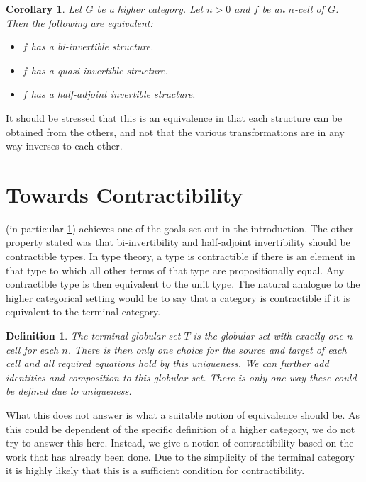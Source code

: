 \documentclass[draft]{article}
\newtheorem{cor}[theorem]{Corollary}
\newtheorem{definition}[theorem]{Definition} \theoremstyle{remark}
\begin{document}
\begin{cor}\label{cor:equiv}
  Let \(G\) be a higher category. Let \(n > 0\) and \(f\) be an
  \(n\)-cell of \(G\). Then the following are equivalent:
  \begin{itemize}
  \item \(f\) has a bi-invertible structure.
  \item \(f\) has a quasi-invertible structure.
  \item \(f\) has a half-adjoint invertible structure.
  \end{itemize}
\end{cor}
It should be stressed that this is an equivalence in that each
structure can be obtained from the others, and not that the various
transformations are in any way inverses to each other.

\section{Towards Contractibility}\label{sec:contractibility}

 (in particular \cref{cor:equiv}) achieves one of the
goals set out in the introduction. The other property stated was that
bi-invertibility and half-adjoint invertibility should be contractible
types. In type theory, a type is contractible if there is an element
in that type to which all other terms of that type are propositionally
equal. Any contractible type is then equivalent to the unit type.
The natural analogue to the higher categorical setting would be to say
that a category is contractible if it is equivalent to the terminal
category.

\begin{definition}
  The \emph{terminal globular set} \(T\) is the globular set with exactly one
  \(n\)-cell for each \(n\). There is then only one choice for the
  source and target of each cell and all required equations hold by
  this uniqueness. We can further add identities and composition to
  this globular set. There is only one way these could be defined due
  to uniqueness.
\end{definition}

What this does not answer is what a suitable notion of equivalence
should be. As this could be dependent of the specific definition of a
higher category, we do not try to answer this here. Instead, we give a
notion of contractibility based on the work that has already been
done. Due to the simplicity of the terminal category it is highly
likely that this is a sufficient condition for contractibility.
\end{document}
